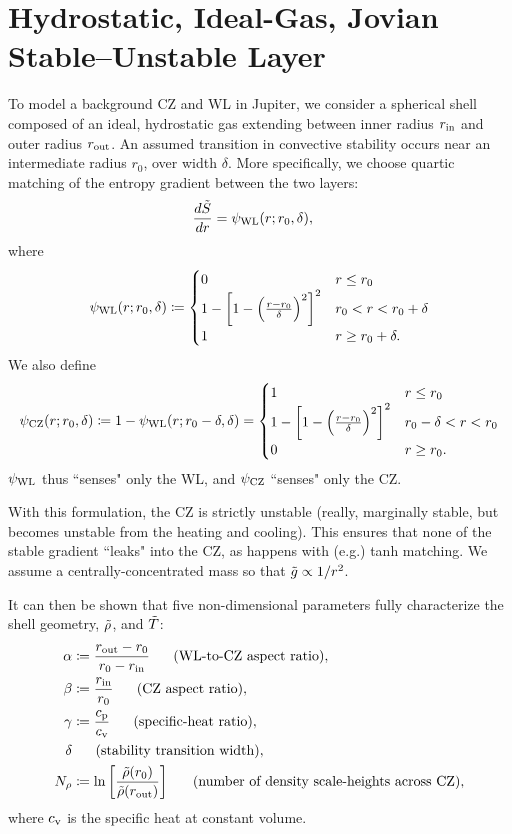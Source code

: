 \documentclass[12pt]{article}
\numberwithin{equation}{section}
\newcommand{\cz}{_{\rm{CZ}}}
\newcommand{\wl}{_{\rm{WL}}}
\begin{document}
\section{Hydrostatic, Ideal-Gas, Jovian Stable--Unstable Layer}
To model a background CZ and WL in Jupiter, we consider a spherical shell composed of an ideal, hydrostatic gas extending between inner radius $r_{\rm{in}}$ and outer radius $r_{\rm{out}}$. An assumed transition in convective stability occurs near an intermediate radius $r_0$, over width $\delta$. More specifically, we choose quartic matching of the entropy gradient between the two layers:
\begin{align}
	\frac{d\entrtilde}{dr} &=\psi\wl(r; r_0,\delta),
\end{align}
where
\begin{equation}
  \psi\wl(r;r_0, \delta)\define \begin{cases}
		0 & r\leq r_0 \\
		1 - \left[1 - \Big{(}\frac{r-r_0}{\delta}\Big{)}^2\right]^2 & r_0  < r < r_0+ \delta\\
		1 & r\geq r_0+\delta.
	\end{cases}
	\label{eq:dsdr}
\end{equation}
We also define
\begin{equation}
	\psi\cz(r;r_0, \delta)\define 1 - \psi\wl(r;r_0-\delta,\delta) =  \begin{cases}
		1 & r\leq r_0 \\
		1 - \left[1 - \Big{(}\frac{r-r_0}{\delta}\Big{)}^2\right]^2 & r_0 -\delta  < r < r_0\\
		0 & r\geq r_0.
	\end{cases}
	\label{eq:dsdr}
\end{equation}
$\psi\wl$ thus ``senses" only the WL, and $\psi\cz$ ``senses" only the CZ. 

With this formulation, the CZ is strictly unstable (really, marginally stable, but becomes unstable from the heating and cooling). This ensures that none of the stable gradient ``leaks" into the CZ, as happens with (e.g.) tanh matching. We assume a centrally-concentrated mass so that $\tilde{g}\propto 1/r^2$. 

It can then be shown that five non-dimensional parameters fully characterize the shell geometry, $\tilde{\rho}$, and $\tilde{T}$:
\begin{subequations}
	\begin{align}
		\alpha&\coloneqq \frac{r_{\rm{out}}-r_0}{r_0-r_{\rm{in}}} \ \ \ \ \ \text{(WL-to-CZ\ aspect ratio)},\\ 
		\beta &\coloneqq \frac{r_{\rm{in}}}{r_0} \ \ \ \ \ \text{(CZ aspect ratio)},\\
		\gamma&\coloneqq \frac{c_{\rm{p}}}{c_{\rm{v}}}\ \ \ \ \ \text{(specific-heat ratio)},\\
		\delta &\ \ \ \ \ \text{(stability transition width)},\\	
		N_\rho &\coloneqq \ln\left[\frac{\tilde{\rho}(r_0)}{\tilde{\rho}(r_{\rm{out}})}\right]\ \ \ \ \ \text{(number of density scale-heights across CZ)},
	\end{align}
\end{subequations}
where $c_{\rm{v}}$ is the specific heat at constant volume. 
\end{document}
